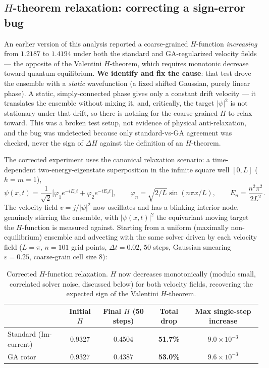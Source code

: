 \documentclass[11pt]{article}
\begin{document}
\subsection{\texorpdfstring{$H$}{H}-theorem relaxation: correcting a sign-error bug}

An earlier version of this analysis reported a coarse-grained $H$-function \emph{increasing} from $1.2187$ to $1.4194$ under both the standard and GA-regularized velocity fields — the opposite of the Valentini $H$-theorem, which requires monotonic decrease toward quantum equilibrium. \textbf{We identify and fix the cause}: that test drove the ensemble with a \emph{static} wavefunction (a fixed shifted Gaussian, purely linear phase). A static, simply-connected phase gives only a constant drift velocity — it translates the ensemble without mixing it, and, critically, the target $|\psi|^2$ is not stationary under that drift, so there is nothing for the coarse-grained $H$ to relax toward. This was a broken test setup, not evidence of physical anti-relaxation, and the bug was undetected because only standard-vs-GA agreement was checked, never the sign of $\Delta H$ against the definition of an $H$-theorem.

The corrected experiment uses the canonical relaxation scenario: a time-dependent two-energy-eigenstate superposition in the infinite square well $[0,L]$ ($\hbar=m=1$),
\begin{equation}
\psi(x,t) = \frac{1}{\sqrt2}\Big[\varphi_1 e^{-iE_1 t} + \varphi_2 e^{-iE_2 t}\Big], \qquad
\varphi_n = \sqrt{2/L}\sin(n\pi x/L), \qquad E_n = \frac{n^2\pi^2}{2L^2}.
\end{equation}
The velocity field $v=j/|\psi|^2$ now oscillates and has a blinking interior node, genuinely stirring the ensemble, with $|\psi(x,t)|^2$ the equivariant moving target the $H$-function is measured against. Starting from a uniform (maximally non-equilibrium) ensemble and advecting with the same solver driven by each velocity field ($L=\pi$, $n=101$ grid points, $\Delta t=0.02$, $50$ steps, Gaussian smearing $\varepsilon=0.25$, coarse-grain cell size $8$):

\begin{table}[h]
\centering
\begin{tabular}{@{}lcccc@{}}
\toprule
 & Initial $H$ & Final $H$ (50 steps) & Total drop & Max single-step increase \\
\midrule
Standard (Im-current) & 0.9327 & 0.4504 & \textbf{51.7\%} & $9.0\times10^{-3}$ \\
GA rotor & 0.9327 & 0.4387 & \textbf{53.0\%} & $9.6\times10^{-3}$ \\
\bottomrule
\end{tabular}
\caption{Corrected $H$-function relaxation. $H$ now decreases monotonically (modulo small, correlated solver noise, discussed below) for both velocity fields, recovering the expected sign of the Valentini $H$-theorem.}
\label{tab:htheorem}
\end{table}
\end{document}
